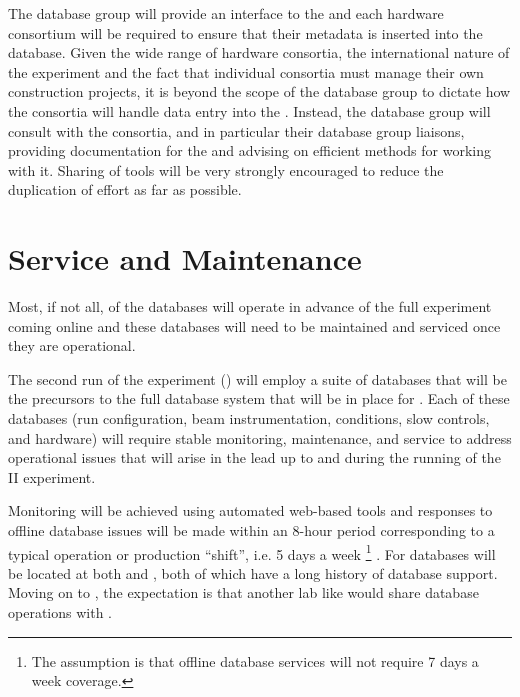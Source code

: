 \documentclass[../main-v1.tex]{subfiles}
\begin{document}
The database group will provide an interface to the  and each hardware consortium will be required to ensure that their metadata is inserted into the database. Given the wide range of hardware consortia, the international nature of the experiment and the fact that individual consortia must manage their own construction projects, it is 
beyond the scope of the database group to dictate how the consortia will handle data entry into the .  Instead, the database group will consult with the consortia, and in particular their database group liaisons, providing documentation for the  and advising on efficient methods for working with it.  Sharing of tools will be very strongly encouraged to reduce the duplication of effort as far as possible.


\section{Service and Maintenance  }
\label{sec:db:service}  

Most, if not all, of the  databases will operate in advance of the full  experiment coming online and these databases will need to be maintained and serviced once they are operational. 

The second run of the  experiment () will employ a suite of databases that will be the precursors to the full database system that will be in place for . Each of these databases (run configuration, beam instrumentation, conditions, slow controls, and hardware) will require stable monitoring, maintenance, and service to address operational issues that will arise in the lead up to and during the running of the  II experiment. 

Monitoring will be achieved using automated web-based tools and responses to offline database issues will be made within an 8-hour period corresponding to a typical operation or production ``shift'', i.e. 5 days a week
\footnote{The assumption is that offline database services will not require 7 days a week coverage.}
. For  databases will be located at both  and , both of which have a long history of database support.  Moving on to , the expectation is that another  lab like  would share database operations with .
\end{document}
